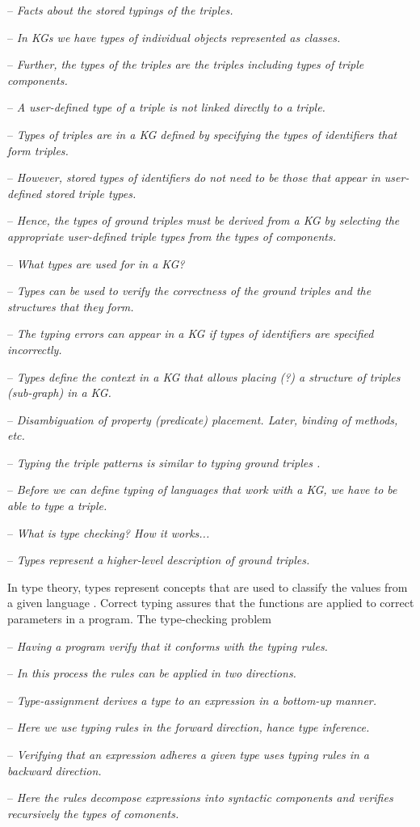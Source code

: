 \documentclass[runningheads]{llncs}
\newcommand{\notes}[1]{\noindent\begin{small}-- \emph{#1}\hfill\break\end{small}}
\newcommand{\nnotes}[1]{\indent\begin{small}-- \emph{#1}\hfill\break\end{small}}
\begin{document}
\notes{Facts about the stored typings of the triples.}
\notes{In KGs we have types of individual objects represented as classes.}
\notes{Further, the types of the triples are the triples including types of triple components.}
\notes{A user-defined type of a triple is not linked directly to a triple.}
\nnotes{Types of triples are in a KG defined by specifying the types of identifiers that form triples.}
\nnotes{However, stored types of identifiers do not need to be those that appear in user-defined stored triple types.}
\nnotes{Hence, the types of ground triples must be derived from a KG by selecting the appropriate user-defined triple types from the types of components.}

\notes{What types are used for in a KG?}
\notes{Types can be used to verify the correctness of the ground triples and the structures that they form.}
\nnotes{The typing errors can appear in a KG if types of identifiers are specified incorrectly.}
\notes{Types define the context in a KG that allows placing (?) a structure of triples (sub-graph) in a KG.}
\notes{Disambiguation of property (predicate) placement. Later, binding of methods, etc.}
\nnotes{Typing the triple patterns is similar to typing ground triples \cite{Savnik2025}.}
\notes{Before we can define typing of languages that work with a KG, we have to be able to type a triple.}

\notes{What is type checking? How it works...}
\notes{Types represent a higher-level description of ground triples.}
In type theory, types represent concepts that are used to classify the
values from a given language \cite{Pierce2002,Hindley1997}. Correct
typing assures that the functions are applied to correct parameters in
a program. The type-checking problem \\
\nnotes{Having a program verify that it conforms with the typing rules.}
\nnotes{In this process the rules can be applied in two directions.}
\nnotes{Type-assignment derives a type to an expression in a bottom-up manner.}
\nnotes{Here we use typing rules in the forward direction, hance type inference.}
\nnotes{Verifying that an expression adheres a given type uses typing rules in a backward direction.}
\nnotes{Here the rules decompose expressions into syntactic components and verifies recursively the types of comonents.}
\end{document}
